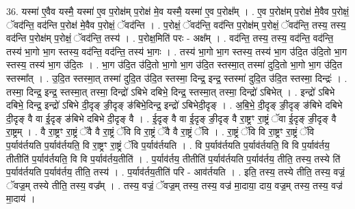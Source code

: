 \documentclass[17pt]{extarticle}
\begin{document}
36. यस्मा॑ ए॒वैव यस्मै॒ यस्मा॑ ए॒व प॒रोक्ष॑म् प॒रोक्ष॑ मे॒व यस्मै॒ यस्मा॑ ए॒व प॒रोक्ष᳚म् । . ए॒व प॒रोक्ष॑म् प॒रोक्ष॑ मे॒वैव प॒रोक्षं॒ ॅवद॑न्ति॒ वद॑न्ति प॒रोक्ष॑ मे॒वैव प॒रोक्षं॒ ॅवद॑न्ति । . प॒रोक्षं॒ ॅवद॑न्ति॒ वद॑न्ति प॒रोक्ष॑म् प॒रोक्षं॒ ॅवद॑न्ति॒ तस्य॒ तस्य॒ वद॑न्ति प॒रोक्ष॑म् प॒रोक्षं॒ ॅवद॑न्ति॒ तस्य॑ । . प॒रोक्ष॒मिति॑ परः - अक्ष᳚म् । . वद॑न्ति॒ तस्य॒ तस्य॒ वद॑न्ति॒ वद॑न्ति॒ तस्य॑ भा॒गो भा॒ग स्तस्य॒ वद॑न्ति॒ वद॑न्ति॒ तस्य॑ भा॒गः । . तस्य॑ भा॒गो भा॒ग स्तस्य॒ तस्य॑ भा॒ग उ॑दि॒त उ॑दि॒तो भा॒ग स्तस्य॒ तस्य॑ भा॒ग उ॑दि॒तः । . भा॒ग उ॑दि॒त उ॑दि॒तो भा॒गो भा॒ग उ॑दि॒त स्तस्मा॒त् तस्मा॑ दुदि॒तो भा॒गो भा॒ग उ॑दि॒त स्तस्मा᳚त् । . उ॒दि॒त स्तस्मा॒त् तस्मा॑ दुदि॒त उ॑दि॒त स्तस्मा॒ दिन्द्र॒ इन्द्र॒ स्तस्मा॑ दुदि॒त उ॑दि॒त स्तस्मा॒ दिन्द्रः॑ । . तस्मा॒ दिन्द्र॒ इन्द्र॒ स्तस्मा॒त् तस्मा॒ दिन्द्रो॑ ऽबिभे दबिभे॒ दिन्द्र॒ स्तस्मा॒त् तस्मा॒ दिन्द्रो॑ ऽबिभेत् । . इन्द्रो॑ ऽबिभे दबिभे॒ दिन्द्र॒ इन्द्रो॑ ऽबिभे दी॒दृङ् ङी॒दृङ् ङ॑बिभे॒दिन्द्र॒ इन्द्रो॑ ऽबिभेदी॒दृङ् । . अ॒बि॒भे॒ दी॒दृङ् ङी॒दृङ् ङ॑बिभे दबिभे दी॒दृङ् वै वा ई॒दृङ् ङ॑बिभे दबिभे दी॒दृङ् वै । . ई॒दृङ् वै वा ई॒दृङ् ङी॒दृङ् वै रा॒ष्ट्रꣳ रा॒ष्ट्रं ॅवा ई॒दृङ् ङी॒दृङ् वै रा॒ष्ट्रम् । . वै रा॒ष्ट्रꣳ रा॒ष्ट्रं ॅवै वै रा॒ष्ट्रं ॅवि वि रा॒ष्ट्रं ॅवै वै रा॒ष्ट्रं ॅवि । . रा॒ष्ट्रं ॅवि वि रा॒ष्ट्रꣳ रा॒ष्ट्रं ॅवि प॒र्याव॑र्तयति प॒र्याव॑र्तयति॒ वि रा॒ष्ट्रꣳ रा॒ष्ट्रं ॅवि प॒र्याव॑र्तयति । . वि प॒र्याव॑र्तयति प॒र्याव॑र्तयति॒ वि वि प॒र्याव॑र्तय॒ तीतीति॑ प॒र्याव॑र्तयति॒ वि वि प॒र्याव॑र्तय॒तीति॑ । . प॒र्याव॑र्तय॒ तीतीति॑ प॒र्याव॑र्तयति प॒र्याव॑र्तय॒ तीति॒ तस्य॒ तस्ये ति॑ प॒र्याव॑र्तयति प॒र्याव॑र्तय॒ तीति॒ तस्य॑ । . प॒र्याव॑र्तय॒तीति॑ परि - आव॑र्तयति । . इति॒ तस्य॒ तस्ये तीति॒ तस्य॒ वज्रं॒ ॅवज्र॒म् तस्ये तीति॒ तस्य॒ वज्र᳚म् । . तस्य॒ वज्रं॒ ॅवज्र॒म् तस्य॒ तस्य॒ वज्र॑ मा॒दाया॒ दाय॒ वज्र॒म् तस्य॒ तस्य॒ वज्र॑ मा॒दाय॑ । \newline
\end{document}

